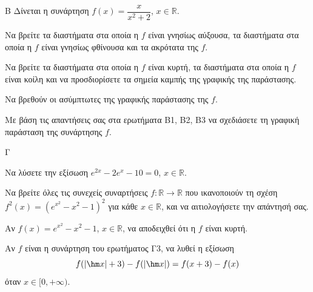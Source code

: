 \begin{thema}{Β}
Δίνεται η συνάρτηση $f(x) = \dfrac{x}{x^2 + 2}$, $x \in \mathbb{R}$.
\begin{erwthma}
    \item Να βρείτε τα διαστήματα στα οποία η $f$ είναι γνησίως αύξουσα, τα διαστήματα στα οποία η $f$ είναι γνησίως φθίνουσα και τα ακρότατα της $f$. 
    \item Να βρείτε τα διαστήματα στα οποία η $f$ είναι κυρτή, τα διαστήματα στα οποία η $f$ είναι κοίλη και να προσδιορίσετε τα σημεία καμπής της γραφικής της παράστασης. 
    \item Να βρεθούν οι ασύμπτωτες της γραφικής παράστασης της $f$. 
    \item Με βάση τις απαντήσεις σας στα ερωτήματα Β1, Β2, Β3 να σχεδιάσετε τη γραφική παράσταση της συνάρτησης $f$. 
\end{erwthma}
\end{thema}
\begin{thema}{Γ}
\begin{erwthma}
    \item Να λύσετε την εξίσωση $e^{2x} - 2e^x - 10 = 0$, $x \in \mathbb{R}$. 
    \item Να βρείτε όλες τις συνεχείς συναρτήσεις $f : \mathbb{R} \to \mathbb{R}$ που ικανοποιούν τη σχέση $f^2(x)=\left(e^{x^2}-x^2-1\right)^2$ για κάθε $x \in \mathbb{R}$, και να αιτιολογήσετε την απάντησή σας. 
    \item Αν $f(x) = e^{x^2}-x^2-1$, $x \in \mathbb{R}$, να αποδειχθεί ότι η $f$ είναι κυρτή. 
    \item Αν $f$ είναι η συνάρτηση του ερωτήματος Γ3, να λυθεί η εξίσωση
    \[
    f(|\hm x| + 3) - f(|\hm x|) = f(x+3) - f(x)
    \]
    όταν $x \in [0, +\infty)$. 
\end{erwthma}
\end{thema}
